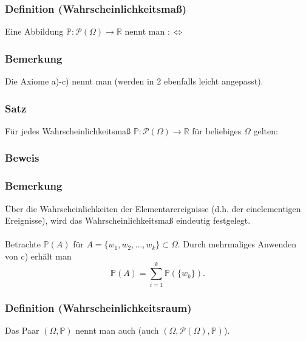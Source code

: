 \subsubsection{Definition (Wahrscheinlichkeitsma\ss{})}
Eine Abbildung $\mathbb{P}\colon\mathcal{P}(\Omega)\to\mathbb{R}$ nennt man  $:\Leftrightarrow$
\subsubsection{Bemerkung}
Die Axiome a)-c) nennt man  (werden in 2 ebenfalls leicht angepasst).
\subsubsection{Satz}
F\"ur jedes Wahrscheinlichkeitsma\ss{} $\mathbb{P}\colon\mathcal{P}(\Omega)\to\mathbb{R}$ f\"ur beliebiges $\Omega$ gelten:
\subsubsection{Beweis}
\weg
\subsubsection{Bemerkung}
\"Uber die Wahrscheinlichkeiten der Elementarereignisse (d.h. der einelementigen Ereignisse), wird das Wahrscheinlichkeitsma\ss{} eindeutig festgelegt.
\\~\\
Betrachte $\mathbb{P}(A)$ f\"ur $A=\{w_1,w_2,\ldots,w_k\}\subset\Omega$. Durch mehrmaliges Anwenden von c) erh\"alt man
\[
\mathbb{P}(A)=\sum_{i=1}^{k}\mathbb{P}(\{w_k\}).
\]
\subsubsection{Definition (Wahrscheinlichkeitsraum)}
Das Paar $(\Omega,\mathbb{P})$ nennt man auch  (auch $(\Omega,\mathcal{P}(\Omega),\mathbb{P})$).


